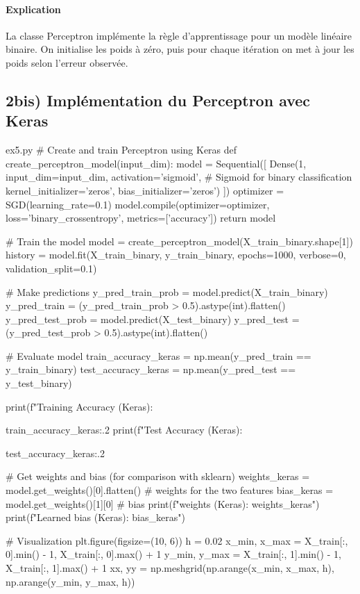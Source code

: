 \documentclass[12pt,a4paper]{article}
\begin{document}
\paragraph{Explication}
La classe Perceptron implémente la règle d'apprentissage pour un modèle
linéaire binaire. On initialise les poids à zéro, puis pour chaque itération
on met à jour les poids selon l'erreur observée.


\subsection*{2bis) Implémentation du Perceptron avec Keras}

\begin{codeholder}{ex5.py}
# Create and train Perceptron using Keras
def create_perceptron_model(input_dim):
    model = Sequential([
        Dense(1, input_dim=input_dim, activation='sigmoid',  # Sigmoid for binary classification
              kernel_initializer='zeros', bias_initializer='zeros')
    ])
    optimizer = SGD(learning_rate=0.1)
    model.compile(optimizer=optimizer, loss='binary_crossentropy', metrics=['accuracy'])
    return model

# Train the model
model = create_perceptron_model(X_train_binary.shape[1])
history = model.fit(X_train_binary, y_train_binary, 
                    epochs=1000, 
                    verbose=0,
                    validation_split=0.1)

# Make predictions
y_pred_train_prob = model.predict(X_train_binary)
y_pred_train = (y_pred_train_prob > 0.5).astype(int).flatten()
y_pred_test_prob = model.predict(X_test_binary)
y_pred_test = (y_pred_test_prob > 0.5).astype(int).flatten()

# Evaluate model
train_accuracy_keras = np.mean(y_pred_train == y_train_binary)
test_accuracy_keras = np.mean(y_pred_test == y_test_binary)

print(f"Training Accuracy (Keras): {train_accuracy_keras:.2%
print(f"Test Accuracy (Keras): {test_accuracy_keras:.2%

# Get weights and bias (for comparison with sklearn)
weights_keras = model.get_weights()[0].flatten()  # weights for the two features
bias_keras = model.get_weights()[1][0]           # bias
print(f"\nLearned weights (Keras): {weights_keras}")
print(f"Learned bias (Keras): {bias_keras}")

# Visualization
plt.figure(figsize=(10, 6))
h = 0.02
x_min, x_max = X_train[:, 0].min() - 1, X_train[:, 0].max() + 1
y_min, y_max = X_train[:, 1].min() - 1, X_train[:, 1].max() + 1
xx, yy = np.meshgrid(np.arange(x_min, x_max, h), np.arange(y_min, y_max, h))

}}
\end{codeholder}
\end{document}
